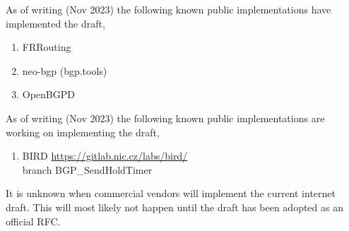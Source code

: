 As of writing (Nov 2023) the following known public implementations have implemented the draft,

\begin{enumerate}
  \item FRRouting\cite{bgpdimpl26:online}
  \item neo-bgp\cite{Whatdoes40:online} (bgp.tools)
  \item OpenBGPD\cite{Rebgpdse40:online}
\end{enumerate}

As of writing (Nov 2023) the following known public implementations are working on implementing the draft,

\begin{enumerate}
  \item BIRD \url{https://gitlab.nic.cz/labs/bird/}\\
  branch BGP_SendHoldTimer
\end{enumerate}

It is unknown when commercial vendors will implement the current internet draft. This will most likely not happen until the draft has been adopted as an official RFC.